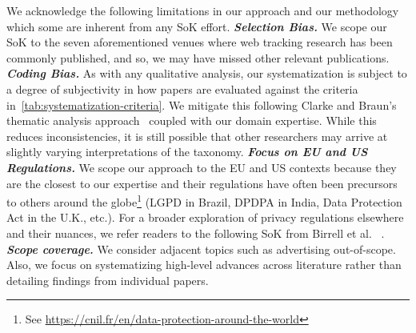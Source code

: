 We acknowledge the following limitations in our approach and our methodology which some are inherent from any SoK effort.
%
\textbf{\textit{Selection Bias.}} We scope our SoK to the seven aforementioned venues where web tracking research has been commonly published, and so, we may have missed other relevant publications.
%
\textbf{\textit{Coding Bias.}} As with any qualitative analysis, our systematization is subject to a degree of subjectivity in how papers are evaluated against the criteria in~\autoref{tab:systematization-criteria}.
We mitigate this following Clarke and Braun's thematic analysis approach~\cite{clarke2013successful} coupled with our domain expertise.
%
While this reduces inconsistencies, it is still possible that other researchers may arrive at slightly varying interpretations of the taxonomy.
%
\textbf{\textit{Focus on EU and US Regulations.}} We scope our approach to the EU and US contexts because they are the closest to our expertise and their regulations have often been precursors to others around the globe\footnote{See \url{https://cnil.fr/en/data-protection-around-the-world}} (LGPD in Brazil, DPDPA in India, Data Protection Act in the U.K., etc.).
For a broader exploration of privacy regulations elsewhere and their nuances, we refer readers to the following SoK from Birrell et al. ~\cite{birrellSoKTechnicalImplementation2024}.
%
\textbf{\textit{Scope coverage.}} We consider adjacent topics such as advertising out-of-scope. Also, we focus on systematizing high-level advances across literature rather than detailing findings from individual papers.